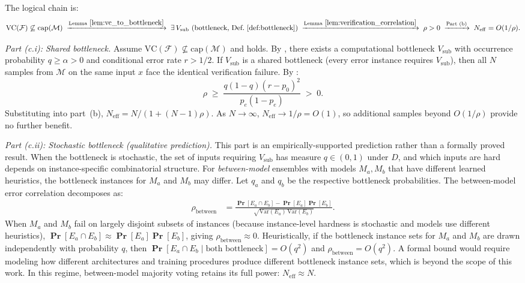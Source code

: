 \documentclass{article}
\theoremstyle{definition}
\theoremstyle{remark}
\newcommand{\VC}{\mathrm{VC}}           %
\newcommand{\calM}{\mathcal{M}}         %
\newcommand{\calF}{\mathcal{F}}         %
\renewcommand{\Pr}{\operatorname{\mathbf{Pr}}}
\begin{document}
The logical chain is:
\[
\VC(\calF) \not\subseteq \mathrm{cap}(\calM) \;\xrightarrow{\text{Lemma}~\ref{lem:vc_to_bottleneck}}\; \exists\, V_{\mathrm{sub}} \text{ (bottleneck, Def.~\ref{def:bottleneck})} \;\xrightarrow{\text{Lemma}~\ref{lem:verification_correlation}}\; \rho > 0 \;\xrightarrow{\text{Part (b)}}\; N_{\mathrm{eff}} = O(1/\rho).
\]

\emph{Part (c.i): Shared bottleneck.}
Assume $\VC(\calF) \not\subseteq \mathrm{cap}(\calM)$ and  holds.
By , there exists a computational bottleneck $V_{\mathrm{sub}}$ with occurrence probability $q \geq \alpha > 0$ and conditional error rate $r > 1/2$.
If $V_{\mathrm{sub}}$ is a shared bottleneck (every error instance requires $V_{\mathrm{sub}}$), then all $N$ samples from $\calM$ on the same input $x$ face the identical verification failure.
By :
\[
\rho \;\geq\; \frac{q(1-q)(r - p_0)^2}{p_e(1-p_e)} \;>\; 0.
\]
Substituting into part~(b), $N_{\mathrm{eff}} = N / (1 + (N-1)\rho)$.
As $N \to \infty$, $N_{\mathrm{eff}} \to 1/\rho = O(1)$, so additional samples beyond $O(1/\rho)$ provide no further benefit.

\emph{Part (c.ii): Stochastic bottleneck (qualitative prediction).}
This part is an empirically-supported prediction rather than a formally proved result.
When the bottleneck is stochastic, the set of inputs requiring $V_{\mathrm{sub}}$ has measure $q \in (0,1)$ under $D$, and which inputs are hard depends on instance-specific combinatorial structure.
For \emph{between-model} ensembles with models $M_a, M_b$ that have different learned heuristics, the bottleneck instances for $M_a$ and $M_b$ may differ.
Let $q_a$ and $q_b$ be the respective bottleneck probabilities.
The between-model error correlation decomposes as:
\begin{align*}
\rho_{\mathrm{between}} &= \frac{\Pr[E_a \cap E_b] - \Pr[E_a]\Pr[E_b]}{\sqrt{\mathrm{Var}(E_a)\,\mathrm{Var}(E_b)}}.
\end{align*}
When $M_a$ and $M_b$ fail on largely disjoint subsets of instances (because instance-level hardness is stochastic and models use different heuristics), $\Pr[E_a \cap E_b] \approx \Pr[E_a]\Pr[E_b]$, giving $\rho_{\mathrm{between}} \approx 0$.
Heuristically, if the bottleneck instance sets for $M_a$ and $M_b$ are drawn independently with probability $q$, then $\Pr[E_a \cap E_b \mid \text{both bottleneck}] = O(q^2)$ and $\rho_{\mathrm{between}} = O(q^2)$.
A formal bound would require modeling how different architectures and training procedures produce different bottleneck instance sets, which is beyond the scope of this work.
In this regime, between-model majority voting retains its full power: $N_{\mathrm{eff}} \approx N$.
\end{document}
